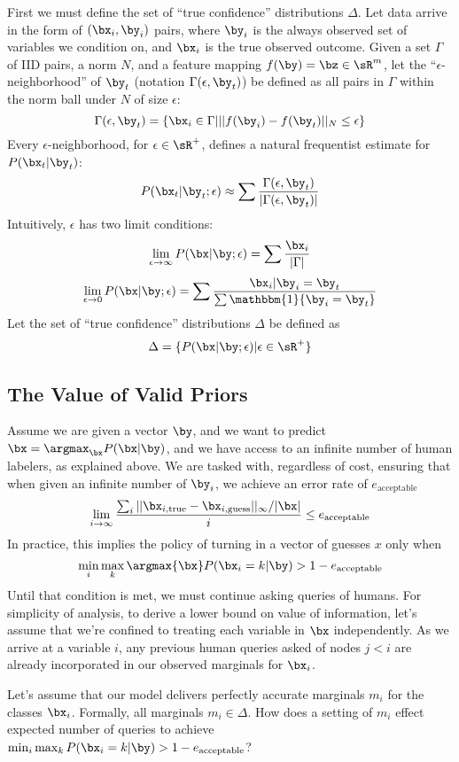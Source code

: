 First we must define the set of ``true confidence'' distributions $\Delta$.
Let data arrive in the form of $(\bx_i,\by_i)$ pairs, where $\by_i$ is the always observed set of variables we condition on, and $\bx_i$ is the true observed outcome.
Given a set $\Gamma$ of IID pairs, a norm $N$, and a feature mapping $f(\by) = \bz \in \sR^m$,
 let the ``$\epsilon$-neighborhood'' of $\by_t$ (notation $\Gamma(\epsilon, \by_t)$) be defined as all pairs in $\Gamma$ within the norm ball under $N$ of size $\epsilon$:
\[\Gamma(\epsilon, \by_t) = \{\bx_i \in \Gamma | ||f(\by_i) - f(\by_t)||_N \leq \epsilon\}\]
Every $\epsilon$-neighborhood, for $\epsilon \in \sR^+$, defines a natural frequentist estimate for $P(\bx_t | \by_t)$:
\[P(\bx_t | \by_t; \epsilon) \approx \sum \frac{\Gamma(\epsilon, \by_t)}{|\Gamma(\epsilon, \by_t)|}\]
Intuitively, $\epsilon$ has two limit conditions:
\[\lim_{\epsilon\to\infty} P(\bx | \by; \epsilon) = \sum \frac{\bx_i}{|\Gamma|}\]
\[\lim_{\epsilon\to0} P(\bx | \by; \epsilon) = \sum \frac{\bx_i | \by_i = \by_t}{\sum \mathbbm{1}\{\by_i = \by_t\}}\]
Let the set of ``true confidence'' distributions $\Delta$ be defined as
\[\Delta = \{P(\bx | \by; \epsilon) | \epsilon \in \sR^+\}\]

\subsection{The Value of Valid Priors}

Assume we are given a vector $\by$, and we want to predict $\bx = \argmax_{\bx} P(\bx | \by)$, and we have access to an infinite number of human labelers, as explained above.
We are tasked with, regardless of cost, ensuring that when given an infinite number of $\by_i$, we achieve an error rate of $e_{\text{acceptable}}$
\[\lim_{i\to\infty} \frac{\sum_i ||\bx_{i,\text{true}} - \bx_{i,\text{guess}}||_{\infty} / |\bx|}{i} \leq e_{\text{acceptable}}\]
In practice, this implies the policy of turning in a vector of guesses $x$ only when
\[\min_{i} \max_{k} \argmax{\bx} P(\bx_i = k | \by) > 1 - e_{\text{acceptable}}\]
Until that condition is met, we must continue asking queries of humans.
For simplicity of analysis, to derive a lower bound on value of information, let's assume that we're confined to treating each variable in $\bx$ independently.
As we arrive at a variable $i$, any previous human queries asked of nodes $j < i$ are already incorporated in our observed marginals for $\bx_i$.

Let's assume that our model delivers perfectly accurate marginals $m_i$ for the classes $\bx_i$.
Formally, all marginals $m_i \in \Delta$.
How does a setting of $m_i$ effect expected number of queries to achieve $\min_{i} \max_{k} P(\bx_i = k | \by) > 1 - e_{\text{acceptable}}$?

